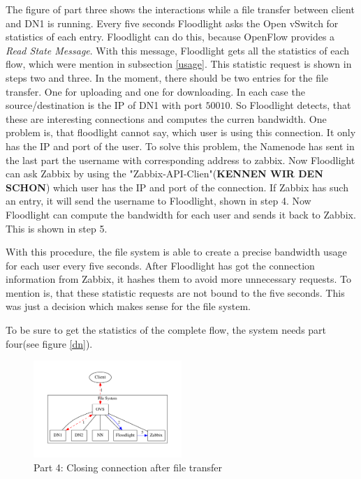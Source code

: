 The figure of part three shows the interactions while a file transfer between client and DN1 is running. Every five seconds Floodlight asks the Open vSwitch for statistics of each entry. Floodlight can do this, because OpenFlow provides a \textit{Read State Message}\cite[p. 30]{ofspec}. With this message, Floodlight gets all the statistics of each flow, which were mention in subsection \ref{usage}. This statistic request is shown in steps two and three. In the moment, there should be two entries for the file transfer. One for uploading and one for downloading. In each case the source/destination is the IP of DN1 with port $50010$. So Floodlight detects, that these are interesting connections and computes the curren bandwidth. One problem is, that floodlight cannot say, which user is using this connection. It only has the IP and port of the user. To solve this problem, the Namenode has sent in the last part the username with corresponding address to zabbix. Now Floodlight can ask Zabbix by using the "Zabbix-API-Clien"(\textbf{KENNEN WIR DEN SCHON}) which user has the IP and port of the connection. If Zabbix has such an entry, it will send the username to Floodlight, shown in step 4. Now Floodlight can compute the bandwidth for each user and sends it back to Zabbix. This is shown in step 5.

With this procedure, the file system is able to create a precise bandwidth usage for each user every five seconds. After Floodlight has got the connection information from Zabbix, it hashes them to avoid more unnecessary requests. To mention is, that these statistic requests are not bound to the five seconds. This was just a decision which makes sense for the file system.

To be sure to get the statistics of the complete flow, the system needs part four(see figure \ref{dn}).  

\begin{figure}[ht]
\centering
\includegraphics[width=0.5\textwidth]{img/closeConnection} 
\caption{Part 4: Closing connection after file transfer}
\label{cc}
\end{figure}

